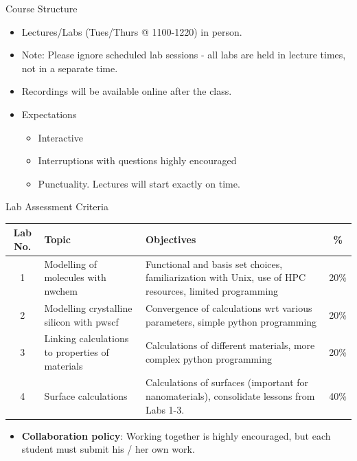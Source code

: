 \documentclass[aspectratio=169]{beamer}
\begin{document}
\begin{frame}{Course Structure}
    \begin{itemize}
        \item Lectures/Labs (Tues/Thurs @ 1100-1220) in person.
        \item Note: Please ignore scheduled lab sessions - all labs are held in lecture times, not in a separate time.
        \item Recordings will be available online after the class.
        \item Expectations
        \begin{itemize}
            \item Interactive
            \item Interruptions with questions highly encouraged
            \item Punctuality. Lectures will start exactly on time.
        \end{itemize}
    \end{itemize}
\end{frame}


\begin{frame}{Lab Assessment Criteria}
\begin{table}[]
    \centering
    \footnotesize
    \begin{tabular}{|c|m{4cm}|p{6cm}|c|}
    \hline
Lab No. & Topic & Objectives & \%\\
\hline
1 & Modelling of molecules with nwchem & Functional and basis set choices, familiarization with Unix, use of HPC resources, limited programming
& 20\%\\
2 & Modelling crystalline silicon with pwscf & 
Convergence of calculations wrt various parameters, simple python programming
& 
20\%\\
3 & Linking calculations to properties of materials & Calculations of different materials, more complex python programming
& 20\%\\
4 & Surface calculations & Calculations of surfaces (important for nanomaterials), consolidate lessons from Labs 1-3.
& 40\%\\
\hline
    \end{tabular}
\end{table}
    \begin{itemize}
        \item \textbf{Collaboration policy}:  Working together is highly encouraged, but each student must submit his / her own work. 
    \end{itemize}
\end{frame}
\end{document}
